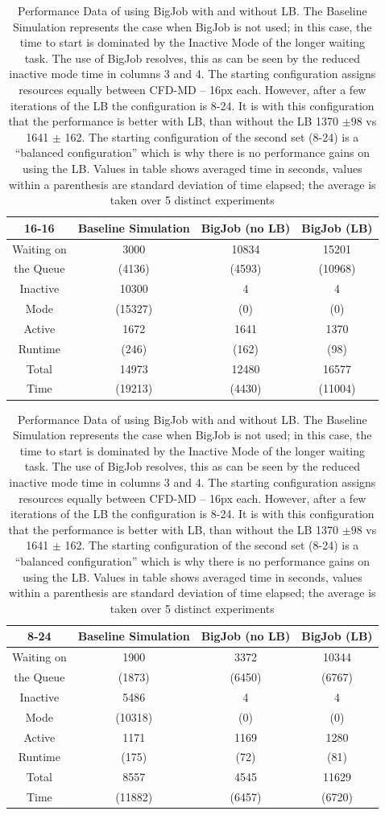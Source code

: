 \documentclass[conference,final]{IEEEtran}
\begin{document}
\begin{table}[!h]
\begin{center}
\label{table:oneBJ_Test}
\caption{\small Performance Data of using BigJob with and without LB. The Baseline Simulation represents the case when BigJob is not used; in this case, the time to start is dominated by the Inactive Mode of the longer waiting task. The use of BigJob resolves, this as can be seen by the reduced inactive mode time in columns
3 and 4. The starting configuration assigns resources equally between CFD-MD -- 16px each. However, after a few iterations of the LB the configuration is 8-24. It is with this configuration that the performance is better with LB, than without the LB 1370 $\pm 98$ vs 1641 $\pm$ 162. The starting configuration of the second set (8-24) is a ``balanced configuration'' which is why there is no performance gains on using the LB. Values in table shows averaged time in seconds, values within a parenthesis are standard deviation of time elapsed; the average is taken over 5 distinct experiments}
\begin{tabular}{ c|| c | c | c }
\hline
16-16 & Baseline Simulation & BigJob (no LB) & BigJob (LB) \\
\hline
\hline
Waiting on & 3000 & 10834 & 15201  \\
the Queue & (4136) & (4593) & (10968) \\
\hline
Inactive & 10300 & 4 & 4 \\
Mode & (15327) & (0) & (0) \\
\hline
Active & 1672 & 1641 & 1370 \\
Runtime & (246) & (162) & (98) \\
\hline
Total & 14973 & 12480 & 16577 \\
Time & (19213) & (4430) & (11004) \\
\hline
\end{tabular}
\begin{tabular}{ c|| c | c | c }
\hline
8-24 & Baseline Simulation & BigJob (no LB) & BigJob (LB) \\
\hline
\hline
Waiting on & 1900 & 3372 & 10344  \\
the Queue & (1873) & (6450) & (6767) \\
\hline
Inactive & 5486 & 4 & 4 \\
Mode & (10318) & (0) & (0) \\
\hline
Active & 1171 & 1169 & 1280 \\
Runtime & (175) & (72) & (81) \\
\hline
Total & 8557 & 4545 & 11629 \\
Time & (11882) & (6457) & (6720) \\
\hline
\end{tabular}
\end{center}
\end{table}
\end{document}
